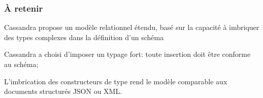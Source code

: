 \begin{frame}[fragile]
\frametitle{À retenir}

\begin{redbullet}
   \item Cassandra propose un modèle relationnel étendu, basé sur la capacité à imbriquer
     des types complexes dans la définition d'un schéma
   \item  Cassandra a choisi d'imposer un typage fort: toute insertion doit être conforme au schéma;
   \item L'imbrication des constructeurs de type
   rend le modèle comparable aux documents structurés JSON ou XML.
\end{redbullet}

\end{frame}